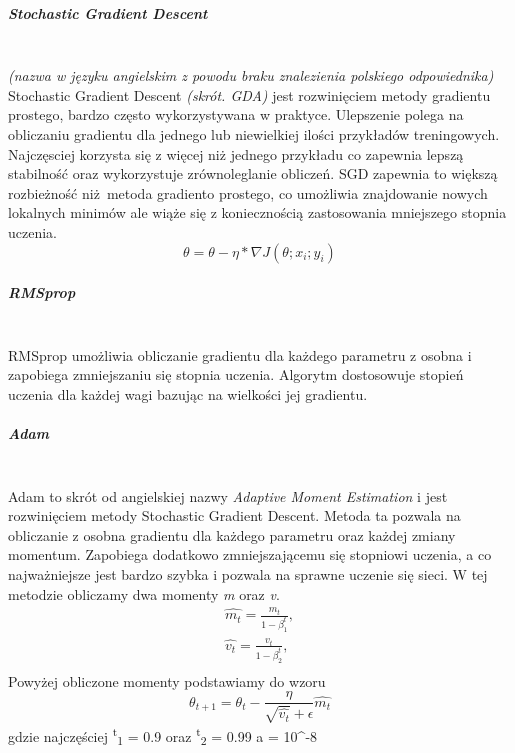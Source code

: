 \subparagraph{Stochastic Gradient Descent} \mbox{}\\
\textit{(nazwa w języku angielskim z powodu braku znalezienia polskiego odpowiednika)}
Stochastic Gradient Descent \textit{(skrót. GDA)} jest rozwinięciem metody gradientu
prostego, bardzo często wykorzystywana w praktyce. Ulepszenie polega na obliczaniu
gradientu dla jednego lub niewielkiej ilości przykładów treningowych. Najczęsciej
korzysta się z więcej niż jednego przykładu co zapewnia lepszą stabilność oraz
wykorzystuje zrównoleglanie obliczeń. SGD zapewnia to większą rozbieżność niż metoda
gradiento prostego, co umożliwia znajdowanie nowych lokalnych minimów ale wiąże się
z koniecznością zastosowania mniejszego stopnia uczenia.
\begin{equation}
\theta = \theta - \eta * \nabla J(\theta; x_i; y_i)
\end{equation}

\subparagraph{RMSprop} \mbox{}\\
RMSprop umożliwia obliczanie gradientu dla każdego parametru z osobna i zapobiega
zmniejszaniu się stopnia uczenia. Algorytm dostosowuje stopień uczenia dla każdej wagi
bazując na wielkości jej gradientu.

\subparagraph{Adam} \mbox{}\\
Adam to skrót od angielskiej nazwy \textit{Adaptive Moment Estimation} i jest rozwinięciem
metody Stochastic Gradient Descent. Metoda ta pozwala na obliczanie z osobna gradientu dla
każdego parametru oraz każdej zmiany momentum. Zapobiega dodatkowo zmniejszającemu się
stopniowi uczenia, a co najważniejsze jest bardzo szybka i pozwala na sprawne uczenie
się sieci. W tej metodzie obliczamy dwa momenty \textit{m} oraz \textit{v}.
\begin{equation}
\begin{align*}
\hat{m_t} = \frac{m_t} {1 - \beta^t_1}, \\
\hat{v_t} = \frac{v_t} {1 - \beta^t_2}, \\
\end{align*}
\end{equation}
Powyżej obliczone momenty podstawiamy do wzoru
\begin{equation}
\theta_{t+1} = \theta_t - \frac {\eta} {\sqrt{\hat{v_t}} + \epsilon} \hat{m_t}
\end{equation}
gdzie najczęściej \textbeta \textsuperscript{t}\textsubscript{1} = 0.9 oraz
\textbeta \textsuperscript{t}\textsubscript{2} = 0.99 a \straightepsilon = 10^{-8}\\

